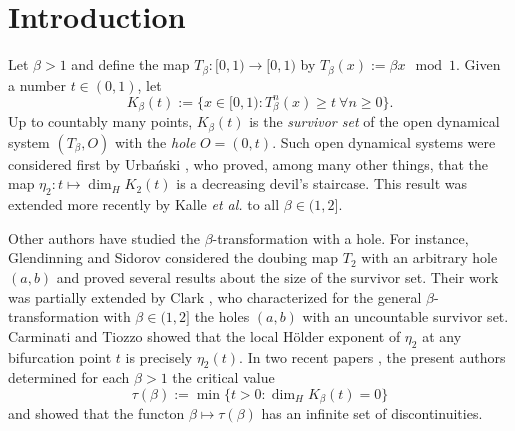 \documentclass[11pt]{amsart}
\theoremstyle{definition}
\theoremstyle{remark}
\numberwithin{equation}{section}
\begin{document}


\maketitle

\tableofcontents

\section{Introduction}\label{sec:introduction}

Let ${\beta>1}$ and define the map $T_\beta:[0,1)\to[0,1)$ by $T_\beta(x):=\beta x\!\!\mod 1$. Given a number $t\in(0,1)$, let
\[
K_\beta(t):=\{x\in[0,1): T_\beta^n(x)\geq t\ \forall n\geq 0\}.
\]
Up to countably many points, $K_\beta(t)$ is the {\em survivor set} of the open dynamical system $(T_\beta,O)$ with the {\em hole} $O=(0,t)$. Such open dynamical systems were considered first by Urba\'{n}ski \cite{Urbanski_1986,Urbanski-87}, who proved, among many other things, that the map $\eta_2: t\mapsto \dim_H K_2(t)$ is a decreasing devil's staircase. This result was extended more recently by Kalle {\em et al.} \cite{Kalle-Kong-Langeveld-Li-18} to all $\beta\in(1,2]$.

Other authors have studied the $\beta$-transformation with a hole. For instance, Glendinning and Sidorov \cite{Glendinning-Sidorov-2015} considered the doubing map $T_2$ with an arbitrary hole $(a,b)$ and proved several results about the size of the survivor set. Their work was partially extended by Clark \cite{Lyndsey-2016}, who characterized for the general $\beta$-transformation with $\beta\in(1,2]$ the holes $(a,b)$ with an uncountable survivor set. Carminati and Tiozzo \cite{Carminati-Tiozzo-2017} showed that the local H\"older exponent of $\eta_2$ at any bifurcation point $t$ is precisely $\eta_2(t)$. {In two recent papers \cite{Allaart-Kong-2021,Allaart-Kong-2024}}, the present authors determined for each $\beta{>1}$ the critical value
\begin{equation} \label{eq:critical-value}
\tau(\beta):=\min\{t>0:\dim_H K_\beta(t)=0\}
\end{equation}
and showed that the functon $\beta\mapsto\tau(\beta)$ has an infinite set of discontinuities.
\end{document}
